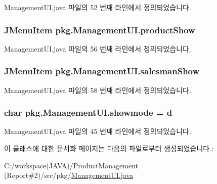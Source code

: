 Management\+U\+I.\+java 파일의 52 번째 라인에서 정의되었습니다.

\subsubsection[{\texorpdfstring{product\+Show}{productShow}}]{\setlength{\rightskip}{0pt plus 5cm}J\+Menu\+Item pkg.\+Management\+U\+I.\+product\+Show\hspace{0.3cm}{\ttfamily [private]}}\hypertarget{classpkg_1_1_management_u_i_a46a473eb18422c9f6011fb4d773f65c5}{}\label{classpkg_1_1_management_u_i_a46a473eb18422c9f6011fb4d773f65c5}


Management\+U\+I.\+java 파일의 56 번째 라인에서 정의되었습니다.

\subsubsection[{\texorpdfstring{salesman\+Show}{salesmanShow}}]{\setlength{\rightskip}{0pt plus 5cm}J\+Menu\+Item pkg.\+Management\+U\+I.\+salesman\+Show\hspace{0.3cm}{\ttfamily [private]}}\hypertarget{classpkg_1_1_management_u_i_ad1d6b0d565e4379362dbb7f4071614a9}{}\label{classpkg_1_1_management_u_i_ad1d6b0d565e4379362dbb7f4071614a9}


Management\+U\+I.\+java 파일의 58 번째 라인에서 정의되었습니다.

\subsubsection[{\texorpdfstring{showmode}{showmode}}]{\setlength{\rightskip}{0pt plus 5cm}char pkg.\+Management\+U\+I.\+showmode = \textquotesingle{}d\textquotesingle{}\hspace{0.3cm}{\ttfamily [private]}}\hypertarget{classpkg_1_1_management_u_i_a06db2befb99ab3b189caa39e736e2d0d}{}\label{classpkg_1_1_management_u_i_a06db2befb99ab3b189caa39e736e2d0d}


Management\+U\+I.\+java 파일의 45 번째 라인에서 정의되었습니다.



이 클래스에 대한 문서화 페이지는 다음의 파일로부터 생성되었습니다.\+:\begin{DoxyCompactItemize}
\item 
C\+:/workspace(\+J\+A\+V\+A)/\+Product\+Management (\+Report\#2)/src/pkg/\hyperlink{_management_u_i_8java}{Management\+U\+I.\+java}\end{DoxyCompactItemize}
